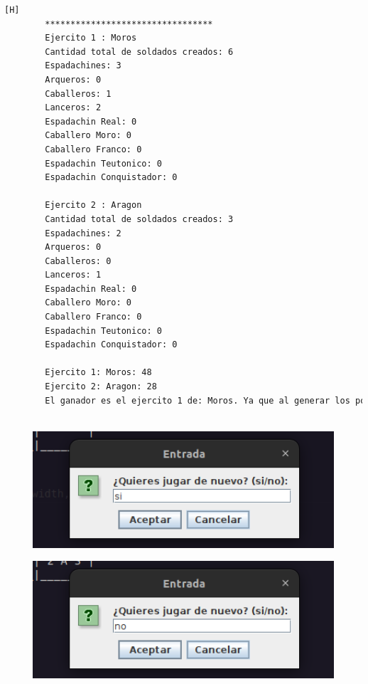 \documentclass{article}
\begin{document}
	\begin{lstlisting}[language=bash,caption={Ejecucion:}][H]
		*********************************
		Ejercito 1 : Moros
		Cantidad total de soldados creados: 6
		Espadachines: 3
		Arqueros: 0
		Caballeros: 1
		Lanceros: 2
		Espadachin Real: 0
		Caballero Moro: 0
		Caballero Franco: 0
		Espadachin Teutonico: 0
		Espadachin Conquistador: 0
		
		Ejercito 2 : Aragon
		Cantidad total de soldados creados: 3
		Espadachines: 2
		Arqueros: 0
		Caballeros: 0
		Lanceros: 1
		Espadachin Real: 0
		Caballero Moro: 0
		Caballero Franco: 0
		Espadachin Teutonico: 0
		Espadachin Conquistador: 0
		
		Ejercito 1: Moros: 48
		Ejercito 2: Aragon: 28
		El ganador es el ejercito 1 de: Moros. Ya que al generar los porcentajes de probabilidad de victoria basada en los niveles de vida de sus soldados y aplicando un experimento aleatorio salió vencedor. (Aleatorio generado : 63.16)
		
	\end{lstlisting}
	\begin{figure}[H]
		\centering
		\includegraphics[width=1.0\textwidth,keepaspectratio]{img/Commit12-2.png}
	\end{figure}
	\begin{figure}[H]
		\centering
		\includegraphics[width=1.0\textwidth,keepaspectratio]{img/Commit12-3.png}
	\end{figure}
\end{document}
